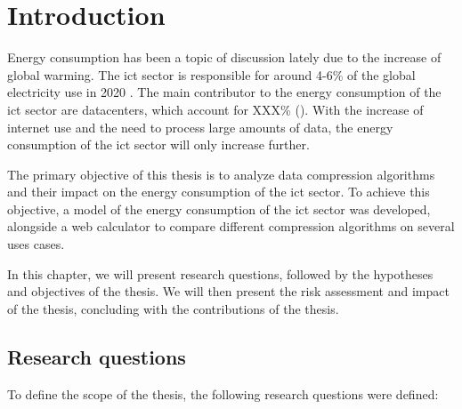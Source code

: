

\chapter{Introduction}
\label{chapter:introduction}

\begin{introduction}

Energy consumption has been a topic of discussion lately due to the increase of global warming. The \ac{ict} sector is responsible for around 4-6\% of the global electricity use in 2020 \citet{UK-parliament}. The main contributor to the energy consumption of the \ac{ict} sector are datacenters, which account for XXX\% (\citet{check source}). With the increase of internet use and the need to process large amounts of data, the energy consumption of the \ac{ict} sector will only increase further.

The primary objective of this thesis is to analyze data compression algorithms and their impact on the energy consumption of the \ac{ict} sector.
To achieve this objective, a model of the energy consumption of the \ac{ict} sector was developed, alongside a web calculator to compare different compression algorithms on several uses cases. 

In this chapter, we will present research questions, followed by the hypotheses and objectives of the thesis. We will then present the risk assessment and impact of the thesis, concluding with the contributions of the thesis. 

\end{introduction}

\section{Research questions}
\label{section:research_questions}

To define the scope of the thesis, the following research questions were defined:

